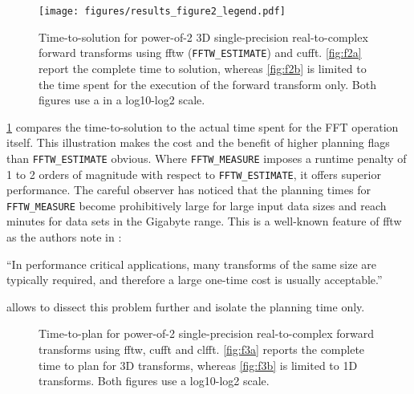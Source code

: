 \begin{figure}[!tbp]
  \centering
  \texttt{[image: figures/results\_figure2\_legend.pdf]}
  \hfill
  \caption{Time-to-solution for power-of-2 3D single-precision real-to-complex forward transforms using fftw (\texttt{FFTW\_ESTIMATE}) and cufft. \cref{fig:f2a} report the complete time to solution, whereas \cref{fig:f2b} is limited to the time spent for the execution of the forward transform only. Both figures use a in a log10-log2 scale.}
  \label{fig:fftw_plan_flags}
\end{figure}

\cref{fig:fftw_plan_flags} compares the time-to-solution to the actual time spent for the FFT operation itself. This illustration makes the cost and the benefit of higher planning flags than \texttt{FFTW\_ESTIMATE} obvious. Where \texttt{FFTW\_MEASURE} imposes a runtime penalty of 1 to 2 orders of magnitude with respect to \texttt{FFTW\_ESTIMATE}, it offers superior performance. The careful observer has noticed that the planning times for \texttt{FFTW\_MEASURE} become prohibitively large for large input data sizes and reach minutes for data sets in the Gigabyte range. This is a well-known feature of fftw as the authors note in \cite{FFTW05}:

\begin{center}
  ``In performance critical applications, many transforms of the same
  size are typically required, and therefore a large one-time cost is
  usually acceptable.''
\end{center}
 
\gearshifft{} allows to dissect this problem further and isolate the planning time only.

\begin{figure}[!tbp]
  \centering
  \hfill
  \caption{Time-to-plan for power-of-2 single-precision real-to-complex forward transforms using fftw, cufft and clfft. \cref{fig:f3a} reports the complete time to plan for 3D transforms, whereas \cref{fig:f3b} is limited to 1D transforms. Both figures use a log10-log2 scale.}
  \label{fig:plan_time_only}
\end{figure}

